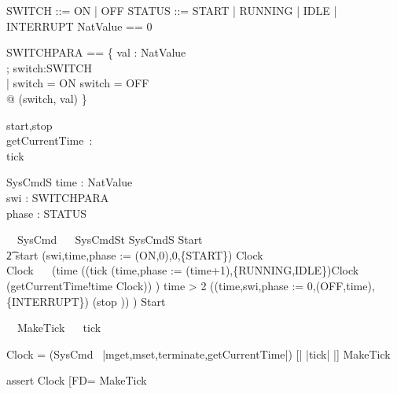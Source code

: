 \begin{zed}
SWITCH ::= ON | OFF
\also STATUS ::= START | RUNNING | IDLE | INTERRUPT
\also NatValue == 0 
\end{zed}
\begin{zed}
SWITCHPARA == \{ val  : NatValue\\; switch:SWITCH  \\
   | switch = ON \lor switch = OFF \\
   @ (switch, val) \}\\
\end{zed}
\begin{circus}
  \circchannel start,stop\\
  \circchannel getCurrentTime~:~\nat\\
  \circchannel tick
\end{circus}

\begin{schema}{SysCmdS}
 time : NatValue\\
 swi : SWITCHPARA\\
 phase : \power STATUS
\end{schema}
\begin{circus}%
  \circprocess\ ~SysCmd ~\circdef~\circbegin
  \circstate SysCmdSt  SysCmdS
  Start ~\circdef~
  \\\t2 start \then (swi,time,phase := (ON,0),0,\{START\}) \circseq Clock\\
  Clock ~\circdef~ 
  (\circif time  \circthen ((tick \then (time,phase := (time+1),\{RUNNING,IDLE\})\circseq Clock \interleave (getCurrentTime!time \then Clock)) )
        \circelse time > 2 \circthen ((time,swi,phase := 0,(OFF,time),\{INTERRUPT\}) \circseq (stop \then \Skip)) 
        \circfi)
  \circspot Start
  \circend
\end{circus}
\begin{circus}
\circprocess\ ~MakeTick ~\circdef~\circbegin
\circspot tick \then \Skip
\circend
\end{circus}


Clock = 
  (SysCmd \ {|mget,mset,terminate,getCurrentTime|}) 
  [| {|tick|} |] MakeTick 

assert Clock [FD= MakeTick